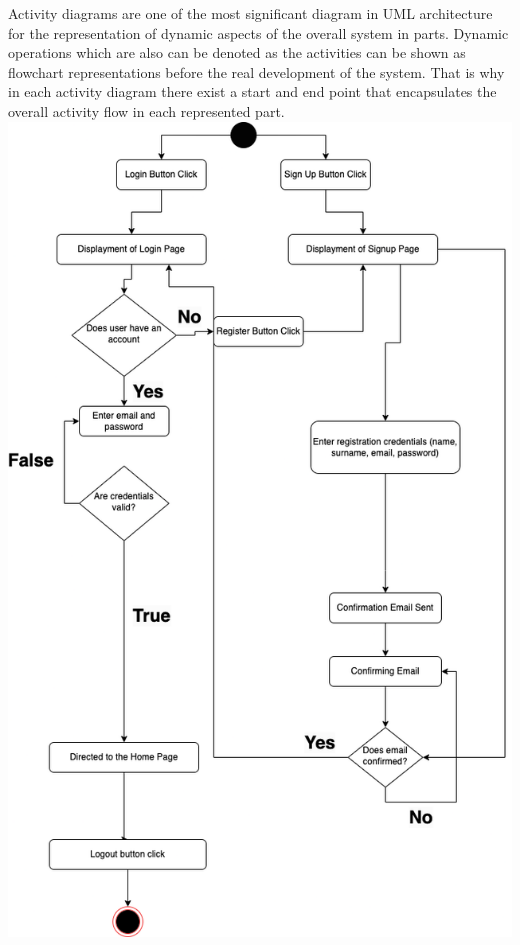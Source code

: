 Activity diagrams are one of the most significant diagram in UML architecture for the representation of dynamic aspects of the overall system in parts. Dynamic operations which are also can be denoted as the activities can be shown as flowchart representations before the real development of the system. That is why in each activity diagram there exist a start and end point that encapsulates the overall activity flow in each represented part.
\includegraphics[scale=0.65]{loginFlow.png} \newline



